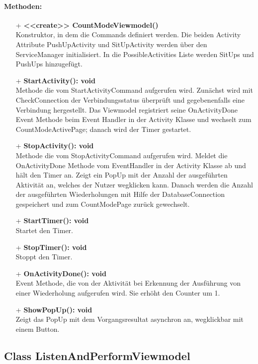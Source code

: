 \documentclass[a4paper,12pt]{article}
\begin{document}
\paragraph{Methoden:}
\begin{itemize}
	\item[+] \textbf{<<create>> CountModeViewmodel()} \\ Konstruktor, in dem die Commands definiert werden. Die beiden Activity Attribute PushUpActivity und SitUpActivity werden über den ServiceManager initialisiert. In die PossibleActivities Liste werden SitUps und PushUps hinzugefügt.
	\item[+] \textbf{StartActivity(): void} \\ Methode die vom StartActivityCommand aufgerufen wird. Zunächst wird mit CheckConnection der Verbindungsstatus überprüft und gegebenenfalls eine Verbindung hergestellt. Das Viewmodel registriert seine OnActivityDone Event Methode beim Event Handler in der Activity Klasse und wechselt zum CountModeActivePage; danach wird der Timer gestartet. 
	\item[+] \textbf{StopActivity(): void} \\ Methode die vom StopActivityCommand aufgerufen wird. Meldet die OnActivityDone Methode vom EventHandler in der Activity Klasse ab und hält den Timer an. Zeigt ein PopUp mit der Anzahl der ausgeführten Aktivität an, welches der Nutzer wegklicken kann. Danach werden die Anzahl der ausgeführten Wiederholungen mit Hilfe der DatabaseConnection gespeichert und zum CountModePage zurück gewechselt. 
	\item[+] \textbf{StartTimer(): void} \\ Startet den Timer. 
	\item[+] \textbf{StopTimer(): void} \\ Stoppt den Timer. 
	\item[+] \textbf{OnActivityDone(): void} \\ Event Methode, die von der Aktivität bei Erkennung der Ausführung von einer Wiederholung aufgerufen wird. Sie erhöht den Counter um 1. 
	\item[+] \textbf{ShowPopUp(): void} \\ Zeigt das PopUp mit dem Vorgangsresultat asynchron an, wegklickbar mit einem Button. 
\end{itemize}

\subsection{Class ListenAndPerformViewmodel}
\end{document}
